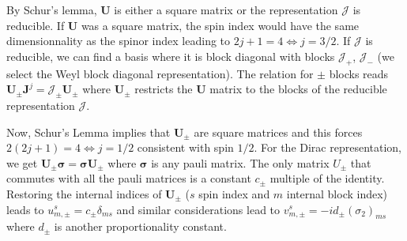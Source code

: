 \documentclass[10pt, a4paper]{article}
\begin{document}
By Schur's lemma, $\mathbf{U}$ is either a square matrix or the representation $\mathcal{J}$ is reducible. If $\mathbf{U}$ was a square matrix, the spin index would have the same dimensionnality as the spinor index leading to $2j+1=4 \iff j = 3/2$. If $\mathcal{J}$ is reducible, we can find a basis where it is block diagonal with blocks $\mathcal{J}_+$, $\mathcal{J}_-$ (we select the Weyl block diagonal representation). The relation for $\pm$ blocks reads 
$
  \mathbf{U}_{\pm}\mathbf{J}^{j} = \mathcal{J}_\pm \mathbf{U}_{\pm}
$
where $\mathbf{U}_{\pm}$ restricts the $\mathbf{U}$ matrix to the blocks of the reducible representation $\mathcal{J}$. 

Now, Schur's Lemma implies that $\mathbf{U}_{\pm}$ are square matrices and this forces $2(2j+1) = 4 \iff j = 1/2$ consistent with spin $1/2$. For the Dirac representation, we get
$
  \mathbf{U}_{\pm}\mathbf{\sigma} = \mathbf{\sigma} \mathbf{U}_{\pm}
$
where $\mathbf{\sigma}$ is any pauli matrix. The only matrix $U_{\pm}$ that commutes with all the pauli matrices is a constant $c_\pm$ multiple of the identity. Restoring the internal indices of $\mathbf{U}_{\pm}$ ($s$ spin index and $m$ internal block index) leads to $u_{m, \pm}^{s} = c_\pm \delta_{ms}$ and similar considerations lead to $v_{m, \pm}^{s} = -id_\pm (\sigma_2)_{ms}$ where $d_\pm$ is another proportionality constant. 
\end{document}

